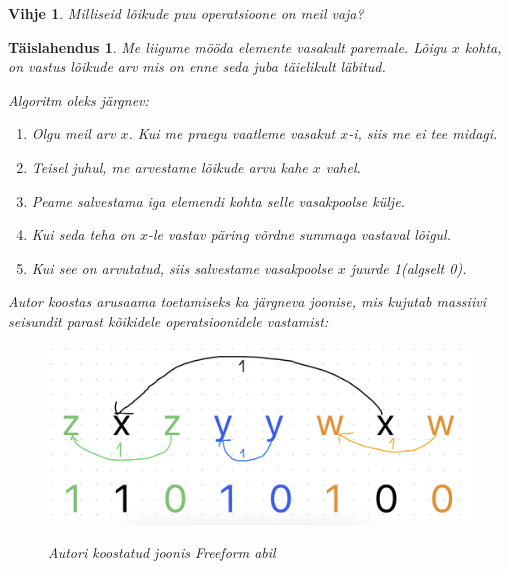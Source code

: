\documentclass{trkut}
\newtheorem*{vihje}{Vihje}
\newtheorem*{solution}{Täislahendus}
\begin{document}
\begin{vihje}
Milliseid lõikude puu operatsioone on meil vaja?
\end{vihje}
\begin{solution}
Me liigume mööda elemente vasakult paremale.
Lõigu $x$ kohta, on vastus lõikude arv mis on enne seda juba täielikult läbitud.

Algoritm oleks järgnev:
\begin{enumerate}
\item Olgu meil arv $x$. Kui me praegu vaatleme vasakut $x$-i, siis me ei tee midagi.
\item Teisel juhul, me arvestame lõikude arvu kahe $x$ vahel. 
\item Peame salvestama iga elemendi kohta selle vasakpoolse külje.
\item Kui seda teha on $x$-le vastav päring võrdne summaga vastaval lõigul.
\item Kui see on arvutatud, siis salvestame vasakpoolse $x$ juurde 1(algselt 0).
\end{enumerate}

Autor koostas arusaama toetamiseks ka järgneva joonise, mis kujutab massiivi seisundit parast kõikidele operatsioonidele vastamist:
\begin{figure}[H]%
    \includegraphics[width=12cm]{nested.jpeg}%
    \caption{Autori koostatud joonis Freeform abil}%
    \label{joonis}%
\end{figure}
\end{solution}
\end{document}
